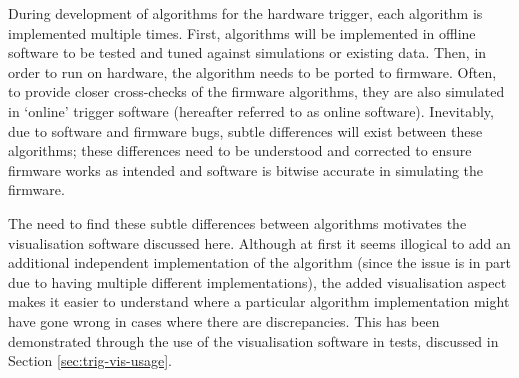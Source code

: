 During development of algorithms for the hardware trigger, each algorithm is
implemented multiple times. First, algorithms will be implemented in offline
software to be tested and tuned against simulations or existing data. Then, in
order to run on hardware, the algorithm needs to be ported to firmware. Often,
to provide closer cross-checks of the firmware algorithms, they are also
simulated in `online' trigger software (hereafter referred to as online
software). Inevitably, due to software and firmware bugs, subtle differences
will exist between these algorithms; these differences need to be understood and
corrected to ensure firmware works as intended and software is bitwise accurate
in simulating the firmware.

The need to find these subtle differences between algorithms motivates the
visualisation software discussed here. Although at first it seems illogical to
add an additional independent implementation of the algorithm (since the issue
is in part due to having multiple different implementations), the added
visualisation aspect makes it easier to understand where a particular algorithm
implementation might have gone wrong in cases where there are discrepancies.
This has been demonstrated through the use of the visualisation software in
tests, discussed in Section \ref{sec:trig-vis-usage}.
